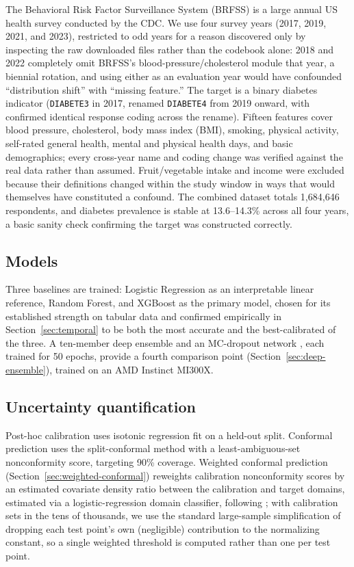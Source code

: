 \documentclass[12pt]{article}
\begin{document}
The Behavioral Risk Factor Surveillance System (BRFSS) is a large annual US health survey conducted by the CDC. We use four survey years (2017, 2019, 2021, and 2023), restricted to odd years for a reason discovered only by inspecting the raw downloaded files rather than the codebook alone: 2018 and 2022 completely omit BRFSS's blood-pressure/cholesterol module that year, a biennial rotation, and using either as an evaluation year would have confounded ``distribution shift'' with ``missing feature.'' The target is a binary diabetes indicator (\texttt{DIABETE3} in 2017, renamed \texttt{DIABETE4} from 2019 onward, with confirmed identical response coding across the rename). Fifteen features cover blood pressure, cholesterol, body mass index (BMI), smoking, physical activity, self-rated general health, mental and physical health days, and basic demographics; every cross-year name and coding change was verified against the real data rather than assumed. Fruit/vegetable intake and income were excluded because their definitions changed within the study window in ways that would themselves have constituted a confound. The combined dataset totals 1{,}684{,}646 respondents, and diabetes prevalence is stable at 13.6--14.3\% across all four years, a basic sanity check confirming the target was constructed correctly.

\subsection{Models}

Three baselines are trained: Logistic Regression as an interpretable linear reference, Random Forest, and XGBoost as the primary model, chosen for its established strength on tabular data and confirmed empirically in Section~\ref{sec:temporal} to be both the most accurate and the best-calibrated of the three. A ten-member deep ensemble and an MC-dropout network \citep{lakshminarayanan2017ensembles,gal2016dropout}, each trained for 50 epochs, provide a fourth comparison point (Section~\ref{sec:deep-ensemble}), trained on an AMD Instinct MI300X.

\subsection{Uncertainty quantification}

Post-hoc calibration uses isotonic regression fit on a held-out split. Conformal prediction uses the split-conformal method with a least-ambiguous-set nonconformity score, targeting 90\% coverage. Weighted conformal prediction (Section~\ref{sec:weighted-conformal}) reweights calibration nonconformity scores by an estimated covariate density ratio between the calibration and target domains, estimated via a logistic-regression domain classifier, following \citet{tibshirani2019conformal}; with calibration sets in the tens of thousands, we use the standard large-sample simplification of dropping each test point's own (negligible) contribution to the normalizing constant, so a single weighted threshold is computed rather than one per test point.
\end{document}
